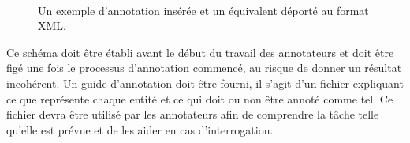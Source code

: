 \documentclass[PhD-Yoann-Dupont.tex]{subfiles}
\begin{document}

\begin{figure}[ht!]
\footnotesize
\begin{xml}\end{xml}
~
\begin{xml}\end{xml}
\caption{Un exemple d'annotation insérée et un équivalent déporté au format XML.}
\label{fig:inline-vs-standoff}
\end{figure}

Ce schéma doit être établi avant le début du travail des annotateurs et doit être figé une fois le processus d'annotation commencé, au risque de donner un résultat incohérent. Un guide d'annotation doit être fourni, il s'agit d'un fichier expliquant ce que représente chaque entité et ce qui doit ou non être annoté comme tel. Ce fichier devra être utilisé par les annotateurs afin de comprendre la tâche telle qu'elle est prévue et de les aider en cas d'interrogation.
\end{document}
